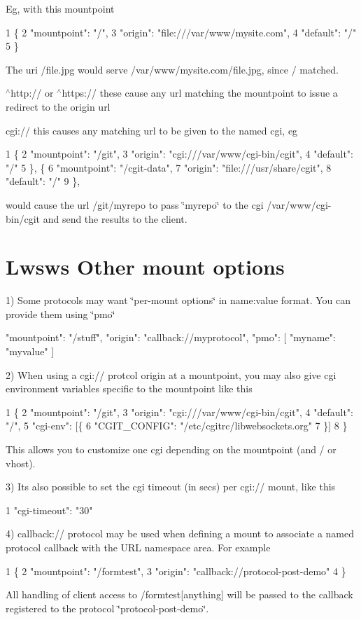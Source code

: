 Eg, with this mountpoint 
\begin{DoxyCode}
1 \{
2  "mountpoint": "/",
3  "origin": "file:///var/www/mysite.com",
4  "default": "/"
5 \}
\end{DoxyCode}
 The uri /file.jpg would serve /var/www/mysite.com/file.\+jpg, since / matched.


\begin{DoxyItemize}
\item $^\wedge$http\+:// or $^\wedge$https\+:// these cause any url matching the mountpoint to issue a redirect to the origin url
\item cgi\+:// this causes any matching url to be given to the named cgi, eg 
\begin{DoxyCode}
1 \{
2  "mountpoint": "/git",
3  "origin": "cgi:///var/www/cgi-bin/cgit",
4  "default": "/"
5 \}, \{
6  "mountpoint": "/cgit-data",
7  "origin": "file:///usr/share/cgit",
8  "default": "/"
9 \},
\end{DoxyCode}
 would cause the url /git/myrepo to pass \char`\"{}myrepo\char`\"{} to the cgi /var/www/cgi-\/bin/cgit and send the results to the client.
\end{DoxyItemize}\hypertarget{md_README.lwsws_lwswsomo}{}\section{Lwsws Other mount options}\label{md_README.lwsws_lwswsomo}
1) Some protocols may want \char`\"{}per-\/mount options\char`\"{} in name\+:value format. You can provide them using \char`\"{}pmo\char`\"{} \begin{DoxyVerb}           {
            "mountpoint": "/stuff",
            "origin": "callback://myprotocol",
            "pmo": [{
                    "myname": "myvalue"
            }]
           }
\end{DoxyVerb}


2) When using a cgi\+:// protcol origin at a mountpoint, you may also give cgi environment variables specific to the mountpoint like this 
\begin{DoxyCode}
1 \{
2  "mountpoint": "/git",
3  "origin": "cgi:///var/www/cgi-bin/cgit",
4  "default": "/",
5  "cgi-env": [\{
6          "CGIT\_CONFIG": "/etc/cgitrc/libwebsockets.org"
7  \}]
8 \}
\end{DoxyCode}
 This allows you to customize one cgi depending on the mountpoint (and / or vhost).

3) It\textquotesingle{}s also possible to set the cgi timeout (in secs) per cgi\+:// mount, like this 
\begin{DoxyCode}
1 "cgi-timeout": "30"
\end{DoxyCode}
 4) {\ttfamily callback\+://} protocol may be used when defining a mount to associate a named protocol callback with the U\+RL namespace area. For example 
\begin{DoxyCode}
1 \{
2  "mountpoint": "/formtest",
3  "origin": "callback://protocol-post-demo"
4 \}
\end{DoxyCode}
 All handling of client access to /formtest\mbox{[}anything\mbox{]} will be passed to the callback registered to the protocol \char`\"{}protocol-\/post-\/demo\char`\"{}.

